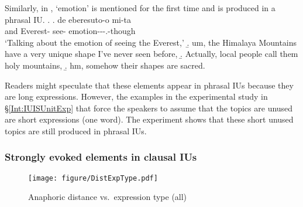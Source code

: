 Similarly,
in \Next[a],
 `emotion' is mentioned for the first time and
is produced in a phrasal IU.
%
\ex.
 \ag. de eberesuto-o mi-ta  {\iub} \\
      and Everest- see- emotion---.-though {} \\
      `Talking about the emotion of seeing the Everest,'
 \b. um, the Himalaya Mountains have a very unique shape I've never seen before,
 \b. Actually, local people call them holy mountains,
 \b. hm, somehow their shapes are sacred.


Readers might speculate that
these elements appear in phrasal IUs because they are long expressions.
However, the examples in the experimental study in \S \ref{Int:IUISUnitExp} that force the speakers to assume that the topics are unused
are short expressions (one word).
The experiment shows that
these short unused topics are still produced in phrasal IUs.


\subsubsection{Strongly evoked elements in clausal IUs}\label{Int:Cor:Topic:CIU}

\begin{figure}
	\begin{center}
	\texttt{[image: figure/DistExpType.pdf]}
	\caption{Anaphoric distance vs.\ expression type (all)}
	\label{DistExpTypeF3}
	\end{center}
\end{figure}


